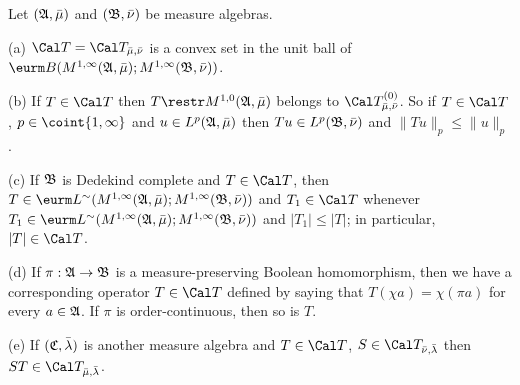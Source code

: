  Let $(\frak A,\bar\mu)$ and 
$(\frak B,\bar\nu)$ be measure algebras.
     
(a) $\Cal T=\Cal T_{\bar\mu,\bar\nu}$ is a convex set in the unit
ball of 
$\eurm B(M^{1,\infty}(\frak A,\bar\mu);M^{1,\infty}(\frak B,\bar\nu))$.
     
(b) If $T\in\Cal T$ then $T\restr M^{1,0}(\frak A,\bar\mu)$ belongs to
$\Cal T^{(0)}_{\bar\mu,\bar\nu}$.
So if $T\in\Cal T$, $p\in\coint{1,\infty}$ and 
$u\in L^p(\frak A,\bar\mu)$ then
$Tu\in L^p(\frak B,\bar\nu)$ and $\|Tu\|_p\le\|u\|_p$.
     
(c) If $\frak B$ is Dedekind complete and $T\in\Cal T$, then 
$T\in\eurm L^{\sim}(M^{1,\infty}(\frak A,\bar\mu);M^{1,\infty}(\frak B,\bar\nu))$ and
$T_1\in\Cal T$ whenever $T_1\in\eurm
L^{\sim}(M^{1,\infty}(\frak A,\bar\mu);M^{1,\infty}(\frak B,\bar\nu))$ and $|T_1|\le|T|$;  in particular, $|T|\in\Cal T$.
     
(d) If $\pi:\frak A\to\frak B$ is a measure-preserving Boolean
homomorphism,
then we have a corresponding operator $T\in\Cal T$ defined by saying
that $T(\chi a)=\chi(\pi a)$ for every $a\in\frak A$.   If $\pi$ is
order-continuous, then so is $T$.
     
(e) If $(\frak C,\bar\lambda)$ is another measure algebra and 
$T\in\Cal T$, $S\in\Cal T_{\bar\nu,\bar\lambda}$ then 
$ST\in\Cal T_{\bar\mu,\bar\lambda}$.
     
